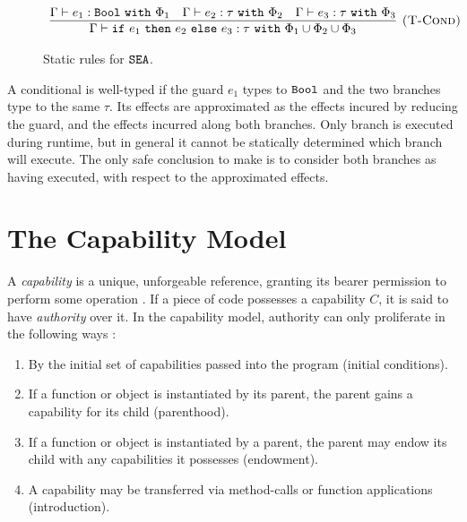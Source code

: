 \begin{figure}[h]


\[
\begin{array}{c}

\infer[\textsc{(T-Cond)}]
	{ \Gamma \vdash \cond{e_1}{e_2}{e_3}: \tau~\kw{with} \Phi_1 \cup \Phi_2 \cup \Phi_3 }
	{ \Gamma \vdash e_1: \Bool~\kw{with} \Phi_1 & \Gamma \vdash e_2: \tau~\kw{with} \Phi_2 & \Gamma \vdash e_3: \tau~\kw{with} \Phi_3 }
	
\end{array}
\]

\vspace{-12pt}
\caption{Static rules for $\mathtt{SEA}$.}
\label{fig:fxtute_static}
\end{figure}

A conditional is well-typed if the guard $e_1$ types to $\mathtt{Bool}$ and the two branches type to the same $\tau$. Its effects are approximated as the effects incured by reducing the guard, and the effects incurred along both branches. Only branch is executed during runtime, but in general it cannot be statically determined which branch will execute. The only safe conclusion to make is to consider both branches as having executed, with respect to the approximated effects.

\section{The Capability Model}

A \textit{capability} is a unique, unforgeable reference, granting its bearer permission to perform some operation \cite{dennis66}. If a piece of code possesses a capability $C$, it is said to have \textit{authority} over it. In the capability model, authority can only proliferate in the following ways \cite{miller06}:

\begin{enumerate}
	\item By the initial set of capabilities passed into the program (initial conditions).
	\item If a function or object is instantiated by its parent, the parent gains a capability for its child (parenthood).
	\item If a function or object is instantiated by a parent, the parent may endow its child with any capabilities it possesses (endowment).
	\item A capability may be transferred via method-calls or function applications (introduction).
\end{enumerate}

